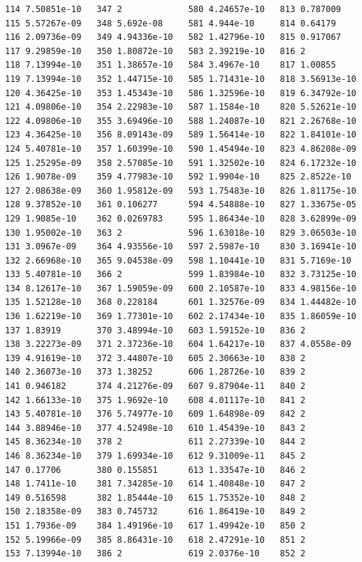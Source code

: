 \documentclass{article}
\begin{document}
\begin{verbatim}
114 7.50851e-10   347 2             580 4.24657e-10   813 0.787009
115 5.57267e-09   348 5.692e-08     581 4.944e-10     814 0.64179
116 2.09736e-09   349 4.94336e-10   582 1.42796e-10   815 0.917067
117 9.29859e-10   350 1.80872e-10   583 2.39219e-10   816 2
118 7.13994e-10   351 1.38657e-10   584 3.4967e-10    817 1.00855
119 7.13994e-10   352 1.44715e-10   585 1.71431e-10   818 3.56913e-10
120 4.36425e-10   353 1.45343e-10   586 1.32596e-10   819 6.34792e-10
121 4.09806e-10   354 2.22983e-10   587 1.1584e-10    820 5.52621e-10
122 4.09806e-10   355 3.69496e-10   588 1.24087e-10   821 2.26768e-10
123 4.36425e-10   356 8.09143e-09   589 1.56414e-10   822 1.84101e-10
124 5.40781e-10   357 1.60399e-10   590 1.45494e-10   823 4.86208e-09
125 1.25295e-09   358 2.57085e-10   591 1.32502e-10   824 6.17232e-10
126 1.9078e-09    359 4.77983e-10   592 1.9904e-10    825 2.8522e-10
127 2.08638e-09   360 1.95812e-09   593 1.75483e-10   826 1.81175e-10
128 9.37852e-10   361 0.106277      594 4.54888e-10   827 1.33675e-05
129 1.9085e-10    362 0.0269783     595 1.86434e-10   828 3.62899e-09
130 1.95002e-10   363 2             596 1.63018e-10   829 3.06503e-10
131 3.0967e-09    364 4.93556e-10   597 2.5987e-10    830 3.16941e-10
132 2.66968e-10   365 9.04538e-09   598 1.10441e-10   831 5.7169e-10
133 5.40781e-10   366 2             599 1.83984e-10   832 3.73125e-10
134 8.12617e-10   367 1.59059e-09   600 2.10587e-10   833 4.98156e-10
135 1.52128e-10   368 0.228184      601 1.32576e-09   834 1.44482e-10
136 1.62219e-10   369 1.77301e-10   602 2.17434e-10   835 1.86059e-10
137 1.83919       370 3.48994e-10   603 1.59152e-10   836 2
138 3.22273e-09   371 2.37236e-10   604 1.64217e-10   837 4.0558e-09
139 4.91619e-10   372 3.44807e-10   605 2.30663e-10   838 2
140 2.36073e-10   373 1.38252       606 1.28726e-10   839 2
141 0.946182      374 4.21276e-09   607 9.87904e-11   840 2
142 1.66133e-10   375 1.9692e-10    608 4.01117e-10   841 2
143 5.40781e-10   376 5.74977e-10   609 1.64898e-09   842 2
144 3.88946e-10   377 4.52498e-10   610 1.45439e-10   843 2
145 8.36234e-10   378 2             611 2.27339e-10   844 2
146 8.36234e-10   379 1.69934e-10   612 9.31009e-11   845 2
147 0.17706       380 0.155851      613 1.33547e-10   846 2
148 1.7411e-10    381 7.34285e-10   614 1.40848e-10   847 2
149 0.516598      382 1.85444e-10   615 1.75352e-10   848 2
150 2.18358e-09   383 0.745732      616 1.86419e-10   849 2
151 1.7936e-09    384 1.49196e-10   617 1.49942e-10   850 2
152 5.19966e-09   385 8.86431e-10   618 2.47291e-10   851 2
153 7.13994e-10   386 2             619 2.0376e-10    852 2

\end{verbatim}
\end{document}
